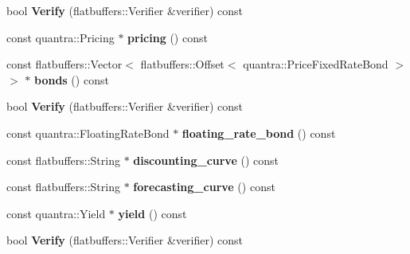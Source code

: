 \begin{DoxyCompactItemize}
bool {\bfseries Verify} (flatbuffers\+::\+Verifier \&verifier) const
\item 
\mbox{\label{structquantra_1_1FLATBUFFERS__FINAL__CLASS_a8e72b9cbbc3759570f15f834326dc962}} 
const quantra\+::\+Pricing $\ast$ {\bfseries pricing} () const
\item 
\mbox{\label{structquantra_1_1FLATBUFFERS__FINAL__CLASS_a62ab27da704bc7bbea4088aef5b1a73a}} 
const flatbuffers\+::\+Vector$<$ flatbuffers\+::\+Offset$<$ quantra\+::\+Price\+Fixed\+Rate\+Bond $>$ $>$ $\ast$ {\bfseries bonds} () const
\item 
\mbox{\label{structquantra_1_1FLATBUFFERS__FINAL__CLASS_aed693ee5a45b5f53af7411f9cab6793a}} 
bool {\bfseries Verify} (flatbuffers\+::\+Verifier \&verifier) const
\item 
\mbox{\label{structquantra_1_1FLATBUFFERS__FINAL__CLASS_a0dd5dd7f5218d25cc51835f175809c89}} 
const quantra\+::\+Floating\+Rate\+Bond $\ast$ {\bfseries floating\+\_\+rate\+\_\+bond} () const
\item 
\mbox{\label{structquantra_1_1FLATBUFFERS__FINAL__CLASS_a81f3cfb641540405607a0804e95e0a93}} 
const flatbuffers\+::\+String $\ast$ {\bfseries discounting\+\_\+curve} () const
\item 
\mbox{\label{structquantra_1_1FLATBUFFERS__FINAL__CLASS_a4586b896a8c839f39c8cefa0b9058369}} 
const flatbuffers\+::\+String $\ast$ {\bfseries forecasting\+\_\+curve} () const
\item 
\mbox{\label{structquantra_1_1FLATBUFFERS__FINAL__CLASS_adda837c430b8e761e469d0f6c244d902}} 
const quantra\+::\+Yield $\ast$ {\bfseries yield} () const
\item 
\mbox{\label{structquantra_1_1FLATBUFFERS__FINAL__CLASS_aed693ee5a45b5f53af7411f9cab6793a}} 
bool {\bfseries Verify} (flatbuffers\+::\+Verifier \&verifier) const
\item 

\end{DoxyCompactItemize}
